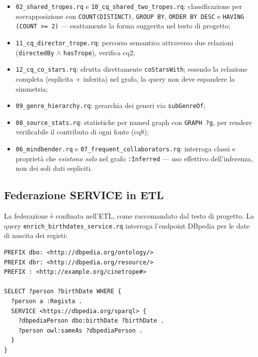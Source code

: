 \documentclass[a4paper,11pt]{article}
\newcommand{\code}[1]{\texttt{#1}}
\begin{document}
\begin{itemize}
  \item \code{02\_shared\_tropes.rq} e \code{10\_cq\_shared\_two\_tropes.rq}:
        classificazione per sovrapposizione con \code{COUNT(DISTINCT)},
        \code{GROUP BY}, \code{ORDER BY DESC} e \code{HAVING (COUNT >= 2)}
        --- esattamente la forma suggerita nel testo di progetto;
  \item \code{11\_cq\_director\_trope.rq}: percorso semantico attraverso due
        relazioni (\code{directedBy} $\wedge$ \code{hasTrope}), verifica
        cq2;
  \item \code{12\_cq\_co\_stars.rq}: sfrutta direttamente
        \code{coStarsWith}; essendo la relazione completa (esplicita +
        inferita) nel grafo, la query non deve espandere la simmetria;
  \item \code{09\_genre\_hierarchy.rq}: gerarchia dei generi via
        \code{subGenreOf};
  \item \code{08\_source\_stats.rq}: statistiche per named graph con
        \code{GRAPH ?g}, per rendere verificabile il contributo di ogni
        fonte (cq8);
  \item \code{06\_mindbender.rq} e \code{07\_frequent\_collaborators.rq}:
        interroga classi e propriet\`a che \emph{esistono solo} nel grafo
        \code{:Inferred} --- uso effettivo dell'inferenza, non dei soli
        dati espliciti.
\end{itemize}

\subsection{Federazione SERVICE in ETL}

La federazione \`e confinata nell'ETL, come raccomandato dal testo di
progetto. La query \code{enrich\_birthdates\_service.rq} interroga
l'endpoint DBpedia per le date di nascita dei registi:

\begin{lstlisting}[style=sparql, caption={Arricchimento federato:
estrazione delle date di nascita da DBpedia.}]
PREFIX dbo: <http://dbpedia.org/ontology/>
PREFIX dbr: <http://dbpedia.org/resource/>
PREFIX : <http://example.org/cinetrope#>

SELECT ?person ?birthDate WHERE {
  ?person a :Regista .
  SERVICE <https://dbpedia.org/sparql> {
    ?dbpediaPerson dbo:birthDate ?birthDate .
    ?person owl:sameAs ?dbpediaPerson .
  }
}
\end{lstlisting}
\end{document}
